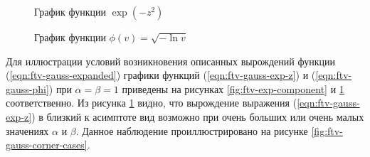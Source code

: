 \begin{figure}[ht]
	\centering
	\begin{minipage}[t]{0.48\textwidth}
		\centering
		\caption{График функции $\exp(-z^2)$}
		\label{fig:ftv-exp-component}
	\end{minipage}
	\hfill
	\begin{minipage}[t]{0.48\textwidth}
		\centering
		\caption{График функции $\phi(v)=\sqrt{-\ln v}$}
		\label{fig:ftv-phi-component}
	\end{minipage}
\end{figure}

Для иллюстрации условий возникновения описанных вырождений функции (\ref{eqn:ftv-gauss-expanded}) графики функций (\ref{eqn:ftv-gauss-exp-z}) и (\ref{eqn:ftv-gauss-phi}) при $\alpha = \beta = 1$ приведены на рисунках \cref{fig:ftv-exp-component} и \cref{fig:ftv-phi-component} соответственно. Из рисунка \cref{fig:ftv-phi-component} видно, что вырождение выражения (\ref{eqn:ftv-gauss-exp-z}) в близкий к асимптоте вид возможно при очень больших или очень малых значениях $\alpha$ и $\beta$. Данное наблюдение проиллюстрировано на рисунке \cref{fig:ftv-gauss-corner-cases}.

